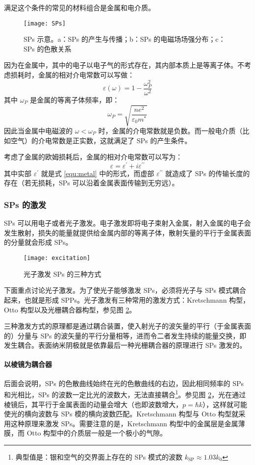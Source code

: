 满足这个条件的常见的材料组合是金属和电介质。
\begin{figure}[htbp]
\centering
\texttt{[image: SPs]}
\caption{\label{fig:SPs} SPs 示意\cite{Barnes:2003aa}。a：SPs 的产生与传播；b：SPs 的电磁场场强分布；c：SPs 的色散关系}
\end{figure}

因为在金属中，其中的电子以电子气的形式存在，其内部本质上是等离子体。不考虑损耗时，金属的相对介电常数可以写做：
\begin{equation}
\varepsilon(\omega) = 1-\dfrac{\omega_P^2}{\omega^2}
\label{equ:metal}
\end{equation}
其中 $\omega_P$ 是金属的等离子体频率，即：
\[
	\omega_P = \sqrt{\dfrac{ne^2}{\varepsilon_0m^*}}
\]
因此当金属中电磁波的 $\omega<\omega_P$ 时，金属的介电常数就是负数。而一般电介质（比如空气）的介电常数是正实数，这就满足了 SPs 的产生条件。

考虑了金属的欧姆损耗后，金属的相对介电常数可以写为\cite{wikipedia:aa}：
\begin{equation}
\label{equ:e}
\varepsilon = \varepsilon^{\prime} + i\varepsilon^{\prime\prime}
\end{equation}
其中实部 $\varepsilon^{\prime}$ 就是式 \ref{equ:metal} 中的形式，而虚部 $\varepsilon^{\prime\prime}$ 就造成了 SPs 的传输长度的存在（若无损耗，SPs 可以沿着金属表面传输到无穷远）。

\subsubsection{SPs 的激发}
SPs 可以用电子或者光子激发\cite{Novotny:2012aa}。电子激发即将电子束射入金属，射入金属的电子会发生散射，损失的能量就提供给金属内部的等离子体，散射矢量的平行于金属表面的分量就会形成 SPs。
\begin{figure}[htbp]
\centering
\texttt{[image: excitation]}
\caption{\label{fig:exc} 光子激发 SPs 的三种方式}
\end{figure}

下面重点讨论光子激发。为了使光子能够激发 SPs，必须将光子与 SPs 模式耦合起来，也就是形成 SPPs。光子激发有三种常用的激发方式：Kretschmann 构型，Otto 构型以及光栅耦合器构型\cite{Novotny:2012aa}，参见图 \ref{fig:exc}。

三种激发方式的原理都是通过耦合装置，使入射光子的波矢量的平行（于金属表面的）分量与 SPs 的波矢量的平行分量相等，进而令二者发生持续的能量交换，即发生耦合。表面纳米阴极就是依靠最后一种光栅耦合器的原理进行 SPs 激发的。

\paragraph{以棱镜为耦合器}
后面会说明，SPs 的色散曲线始终在光的色散曲线的右边，因此相同频率的 SPs 和光相比，SPs 的波数一定比光的波数大，无法直接耦合\footnote{典型值是：银和空气的交界面上存在的 SPs 模式的波数 $k_{\text{SP}}\approx 1.03k_0$}。参见图 \ref{fig:exc}，光在通过棱镜后，其平行于金属表面的动量会增大（也即波数增大，$p=\hbar k$），这样就可能使光的横向波数与 SPs 模的横向波数匹配。Kretschmann 构型与 Otto 构型就采用这种原理来激发 SPs。需要注意的是，Kretschmann 构型中的金属层是金属薄膜，而 Otto 构型中的介质层一般是一个极小的气隙。

